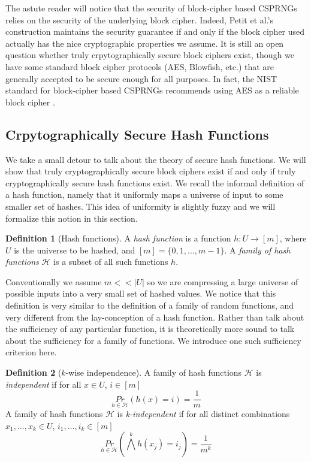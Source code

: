 \documentclass[titlepage]{article}
\theoremstyle{definition}
\newtheorem{definition}{Definition}[section]
\begin{document}
The astute reader will notice that the security of block-cipher based CSPRNGs relies on the security of the underlying block cipher. Indeed, Petit et al.'s construction maintains the security guarantee if and only if the block cipher used actually has the nice cryptographic properties we assume. It is still an open question whether truly crpytographically secure block ciphers exist, though we have some standard block cipher protocols (AES, Blowfish, etc.) that are generally accepted to be secure enough for all purposes. In fact, the NIST standard for block-cipher based CSPRNGs recommends using AES as a reliable block cipher \cite{NIST}.

\subsection{Crpytographically Secure Hash Functions}
We take a small detour to talk about the theory of secure hash functions. We will show that truly cryptographically secure block ciphers exist if and only if truly cryptographically secure hash functions exist. We recall the informal definition of a hash function, namely that it uniformly maps a universe of input to some smaller set of hashes. This idea of uniformity is slightly fuzzy and we will formalize this notion in this section.

\begin{definition}[Hash functions]
A \textit{hash function} is a function $h : U \to [m]$, where $U$ is the universe to be hashed, and $[m] = \{0, 1, \dots, m-1\}$. A \textit{family of hash functions} $\mathcal{H}$ is a subset of all such functions $h$.
\end{definition}

Conventionally we assume $m << |U|$ so we are compressing a large universe of possible inputs into a very small set of hashed values. We notice that this definition is very similar to the definition of a family of random functions, and very different from the lay-conception of a hash function. Rather than talk about the sufficiency of any particular function, it is theoretically more sound to talk about the sufficiency for a family of functions. We introduce one such sufficiency criterion here.

\begin{definition}[$k$-wise independence]\label{def:independent}
A family of hash functions $\mathcal{H}$ is \textit{independent} if for all $x \in U$, $i \in [m]$
$$\underset{h \in \mathcal{H}}{Pr}(h(x) = i) = \frac{1}{m}$$
A family of hash functions $\mathcal{H}$ is \textit{k-independent} if for all distinct combinations $x_1,\dots, x_k \in U$, $i_1, \dots, i_k \in [m]$
$$\underset{h \in \mathcal{H}}{Pr}(\bigwedge^k h(x_j) = i_j) = \frac{1}{m^k}$$
\end{definition}
\end{document}
